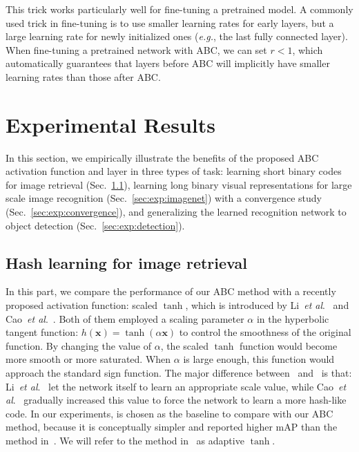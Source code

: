 \documentclass[runningheads]{llncs}
\newcommand{\etal}{\textit{et al}.}
\begin{document}
This trick works particularly well for fine-tuning a pretrained model. A commonly used trick in fine-tuning is to use smaller learning rates for early layers, but a large learning rate for newly initialized ones (\emph{e.g.}, the last fully connected layer). When fine-tuning a pretrained network with ABC, we can set $r<1$, which automatically guarantees that layers before ABC will implicitly have smaller learning rates than those after ABC.

\section{Experimental Results}

In this section, we empirically illustrate the benefits of the proposed ABC activation function and layer in three types of task: learning short binary codes for image retrieval (Sec.~\ref{sec:exp:hashing}), learning long binary visual representations for large scale image recognition (Sec.~\ref{sec:exp:imagenet}) with a convergence study (Sec.~\ref{sec:exp:convergence}), and generalizing the learned recognition network to object detection (Sec.~\ref{sec:exp:detection}).

\subsection{Hash learning for image retrieval} \label{sec:exp:hashing}

In this part, we compare the performance of our ABC method with a recently proposed activation function: scaled $\tanh$, which is introduced by Li~\etal~\cite{Li17ACMMM_r14} and Cao~\etal~\cite{Cao17ICCV_r15}. Both of them employed a scaling parameter $\alpha$ in the hyperbolic tangent function: $h(\mathbf{x})=\tanh(\alpha \mathbf{x})$ to control the smoothness of the original function. By changing the value of $\alpha$, the scaled $\tanh$ function would become more smooth or more saturated. When $\alpha$ is large enough, this function would approach the standard sign function. The major difference between~\cite{Li17ACMMM_r14} and~\cite{Cao17ICCV_r15} is that: Li~\etal~\cite{Li17ACMMM_r14} let the network itself to learn an appropriate scale value, while Cao~\etal~\cite{Cao17ICCV_r15} gradually increased this value to force the network to learn a more hash-like code. In our experiments, \cite{Cao17ICCV_r15} is chosen as the baseline to compare with our ABC method, because it is conceptually simpler and reported higher mAP than the method in~\cite{Li17ACMMM_r14}. We will refer to the method in~\cite{Cao17ICCV_r15} as adaptive $\tanh$.
\end{document}
